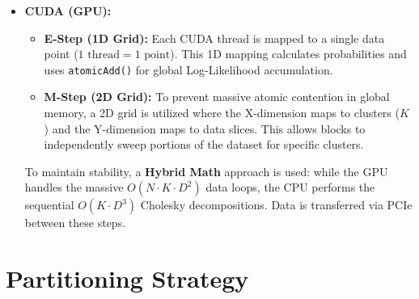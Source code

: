 \documentclass[10pt]{article}
\begin{document}
\begin{itemize}
    \item \textbf{CUDA (GPU):}
    \begin{itemize}
        \item \textbf{E-Step (1D Grid):} Each CUDA thread is mapped to a single data point ($1 \text{ thread} = 1 \text{ point}$). This 1D mapping calculates probabilities and uses \texttt{atomicAdd()} for global Log-Likelihood accumulation.
        \item \textbf{M-Step (2D Grid):} To prevent massive atomic contention in global memory, a 2D grid is utilized where the X-dimension maps to clusters ($K$) and the Y-dimension maps to data slices. This allows blocks to independently sweep portions of the dataset for specific clusters.
    \end{itemize}
    To maintain stability, a \textbf{Hybrid Math} approach is used: while the GPU handles the massive $O(N \cdot K \cdot D^2)$ data loops, the CPU performs the sequential $O(K \cdot D^3)$ Cholesky decompositions. Data is transferred via PCIe between these steps.
\end{itemize}

\section{Partitioning Strategy}
\end{document}
